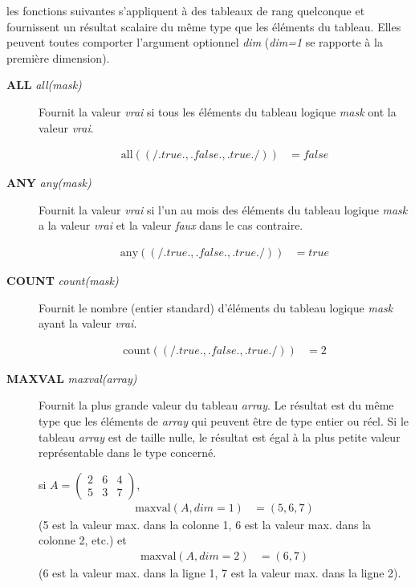 \documentclass[a4paper,twoside]{article}
\begin{document}
\begin{remarque}
les fonctions suivantes s'appliquent à des tableaux de rang quelconque et fournissent un résultat scalaire du même type que les éléments du tableau. Elles peuvent toutes comporter l'argument optionnel \emph{dim} (\emph{dim=1} se rapporte à la première dimension). 
\end{remarque}


\begin{description}
\item[\textbf{ALL} \emph{all(mask)}] Fournit la valeur \emph{vrai} si tous les éléments du tableau logique \emph{mask} ont la valeur \emph{vrai}. 
\begin{exemple}
\begin{align}
\mathrm{all}((/.true.,.false.,.true./))  &= false
\end{align}
\end{exemple}

\item[\textbf{ANY} \emph{any(mask)}] Fournit la valeur \emph{vrai} si l'un au mois des éléments du tableau logique \emph{mask} a la valeur \emph{vrai} et la valeur \emph{faux} dans le cas contraire. 
\begin{exemple}
\begin{align}
\mathrm{any}((/.true.,.false.,.true./))  &= true
\end{align}
\end{exemple}

\item[\textbf{COUNT} \emph{count(mask)}] Fournit le nombre (entier standard) d'éléments du tableau logique \emph{mask} ayant la valeur \emph{vrai}.
\begin{exemple}
\begin{align}
\mathrm{count}((/.true.,.false.,.true./))  &= 2
\end{align}
\end{exemple}

\item[\textbf{MAXVAL} \emph{maxval(array)}] Fournit la plus grande valeur du tableau \emph{array}. Le résultat est du même type que les éléments de \emph{array} qui peuvent être de type entier ou réel. Si le tableau \emph{array} est de taille nulle, le résultat est égal à la plus petite valeur représentable dans le type concerné. 
\begin{exemple}
si $A=\left(
\begin{array}{ccc}
    2 & 6 & 4  \\
    5 & 3 & 7
\end{array}\right)$, 
\begin{align}
\mathrm{maxval}(A,dim=1)  &= (5,6,7)
\end{align}
(5 est la valeur max. dans la colonne 1, 6 est la valeur max. dans la colonne 2, etc.) et 
\begin{align}
\mathrm{maxval}(A,dim=2)  &= (6,7)
\end{align}
(6 est la valeur max. dans la ligne 1, 7 est la valeur max. dans la ligne 2).
\end{exemple}


\end{description}
\end{document}

